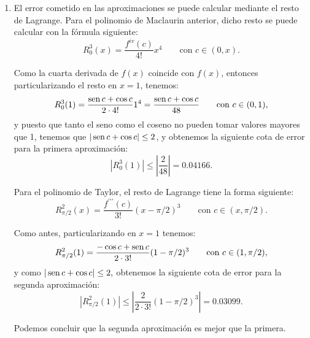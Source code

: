 {\begin{enumerate}
y, de nuevo, tomando $x=1$, la aproximación que da este polinomio para $f(1)=\frac{\sen 1+\cos 1}2$ es:
\[
P_{\pi/2}^2(1)=\frac 12-\frac{1}{2}(1-\pi/2)-\frac{1}{4}(1-\pi/2)^2 = 0.70395.
\]

\item  El error cometido en las aproximaciones se puede calcular mediante el resto de Lagrange. Para el polinomio de Maclaurin anterior, dicho resto se puede calcular con la fórmula siguiente:
\[
R_0^3(x) = \frac{f^{iv}(c)}{4!}x^4\qquad \mbox{con }c\in (0,x).
\]

Como la cuarta derivada de $f(x)$ coincide con $f(x)$, entonces particularizando el resto en $x=1$, tenemos:
\[
R_0^3(1)=\frac{\operatorname{sen} c+\cos c}{2\cdot 4!}1^4 = \frac{\operatorname{sen} c+\cos c}{48} \qquad \text{con }c\in (0,1),
\]
y puesto que tanto el seno como el coseno no pueden tomar valores mayores que 1, tenemos que $|\operatorname{sen} c+\cos c|\leq 2$, y obtenemos la siguiente cota de error para la primera aproximaci\'{o}n:
\[
|R_0^3(1)|\leq |\frac{2}{48}|=0.04166.
\]

Para el polinomio de Taylor, el resto de Lagrange tiene la forma siguiente:
\[
R_{\pi/2}^2(x)=\frac{f^{\prime \prime \prime }(c)}{3!}(x-\pi/2)^3\qquad \mbox{con }c\in (x,\pi /2).
\]

Como antes, particularizando en $x=1$ tenemos:
\[
R_{\pi/2}^2(1)=\frac{-\cos c+\operatorname{sen} c}{2\cdot 3!}(1-\pi/2)^3 \qquad \mbox{con }c\in (1,\pi /2),
\]
y como $|\operatorname{sen} c+\cos c|\leq 2,$ obtenemos la siguiente cota de error para la segunda aproximación:
\[
|R_{\pi/2}^2(1)|\leq |\frac{2}{2\cdot 3!}(1-\pi/2)^3|=0.03099.
\]

Podemos concluir que la segunda aproximación es mejor que la primera.
\end{enumerate}
}


